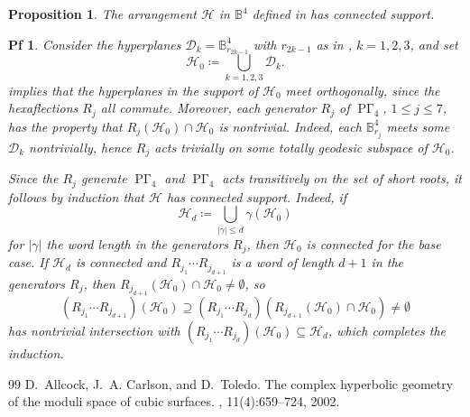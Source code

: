 \documentclass[10pt,a4paper]{amsart}
\newtheorem{prop}{Proposition}
\newtheorem{pf}{Pf}
\DeclareMathOperator{\PGam}{\mathrm{P}\Gamma}
\newcommand{\bbB}{\mathbb{B}}
\newcommand{\calD}{\mathcal{D}}
\newcommand{\calH}{\mathcal{H}}
\newcommand{\gam}{\gamma}
\begin{document}
\begin{prop}\label{prop:ConnectedSupport}
The arrangement $\calH$ in $\bbB^4$ defined in  has connected support.
\end{prop}

\begin{pf}
Consider the hyperplanes $\calD_k = \bbB^4_{r_{2 k - 1}}$ with $r_{2 k - 1}$ as in , $k = 1,2,3$, and set
	\[
	\calH_0 \coloneqq \bigcup_{k = 1,2,3} \calD_k.
	\]
 implies that the hyperplanes in the support of $\calH_0$ meet orthogonally, since the hexaflections $R_j$ all commute. Moreover, each generator $R_j$ of $\PGam_4$, $1 \le j \le 7$, has the property that $R_j(\calH_0) \cap \calH_0$ is nontrivial. Indeed, each $\bbB^4_{r_j}$ meets some $\calD_k$ nontrivially, hence $R_j$ acts trivially on some totally geodesic subspace of $\calH_0$.

Since the $R_j$ generate $\PGam_4$ and $\PGam_4$ acts transitively on the set of short roots, it follows by induction that $\calH$ has connected support. Indeed, if
	\[
	\calH_d \coloneqq \bigcup_{|\gam| \le d}\gam(\calH_0)
	\]
for $|\gam|$ the word length in the generators $R_j$, then $\calH_0$ is connected for the base case. If $\calH_d$ is connected and $R_{j_1} \cdots R_{j_{d+1}}$ is a word of length $d+1$ in the generators $R_j$, then $R_{j_{d+1}}(\calH_0) \cap \calH_0 \neq \emptyset$, so
	\[
	(R_{j_1} \cdots R_{j_{d+1}})(\calH_0) \supseteq (R_{j_1} \cdots R_{j_d})\!\left(R_{j_{d+1}}(\calH_0) \cap \calH_0\right)\! \neq \emptyset
	\]
has nontrivial intersection with $(R_{j_1} \cdots R_{j_d})(\calH_0) \subseteq \calH_d$, which completes the induction.
\end{pf}

\begin{thebibliography}{99}
 D.~Allcock, J.~A. Carlson, and D.~Toledo. \newblock The complex hyperbolic geometry of the moduli space of cubic surfaces. , 11(4):659--724, 2002.
\end{thebibliography}
\end{document}
